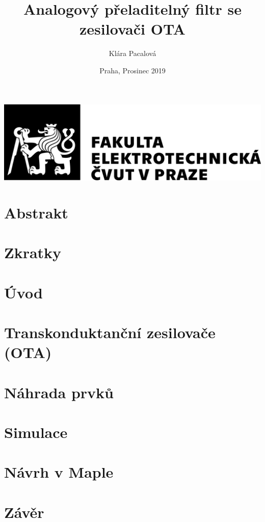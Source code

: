 \documentclass[twoside]{article}
\newcommand{\sekce}[1]{\newpage \section{#1}}
\newcommand{\nadpis}[1]{\newpage \section*{#1}}
\begin{document}
\begin{titlepage}
\centering
\includegraphics[scale=0.7]{logo_FEL_cb.jpg}
\title{Analogový přeladitelný filtr se zesilovači OTA}
\author{Klára Pacalová}
\date{Praha, Prosinec 2019}
\maketitle
\end{titlepage}

\tableofcontents
\newpage
\listoffigures
\newpage
\listoftables
\nadpis{Abstrakt}

\nadpis{Zkratky}

\sekce{Úvod}

\sekce{Transkonduktanční zesilovače (OTA)}

\sekce{Náhrada prvků}\label{s:NAH}

\sekce{Simulace}

\sekce{Návrh v Maple}\label{s:MAPLE}

\sekce{Závěr}


\end{document}

